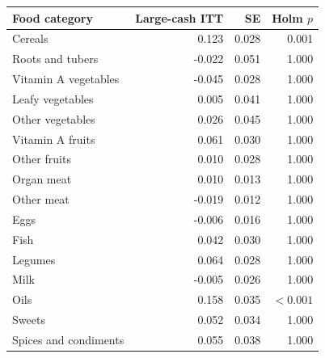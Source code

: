 \begin{tabular}{lrrr}
\toprule
Food category & Large-cash ITT & SE & Holm $p$ \\
\midrule
Cereals & 0.123 & 0.028 & 0.001 \\
Roots and tubers & -0.022 & 0.051 & 1.000 \\
Vitamin A vegetables & -0.045 & 0.028 & 1.000 \\
Leafy vegetables & 0.005 & 0.041 & 1.000 \\
Other vegetables & 0.026 & 0.045 & 1.000 \\
Vitamin A fruits & 0.061 & 0.030 & 1.000 \\
Other fruits & 0.010 & 0.028 & 1.000 \\
Organ meat & 0.010 & 0.013 & 1.000 \\
Other meat & -0.019 & 0.012 & 1.000 \\
Eggs & -0.006 & 0.016 & 1.000 \\
Fish & 0.042 & 0.030 & 1.000 \\
Legumes & 0.064 & 0.028 & 1.000 \\
Milk & -0.005 & 0.026 & 1.000 \\
Oils & 0.158 & 0.035 & $<0.001$ \\
Sweets & 0.052 & 0.034 & 1.000 \\
Spices and condiments & 0.055 & 0.038 & 1.000 \\
\bottomrule
\end{tabular}
